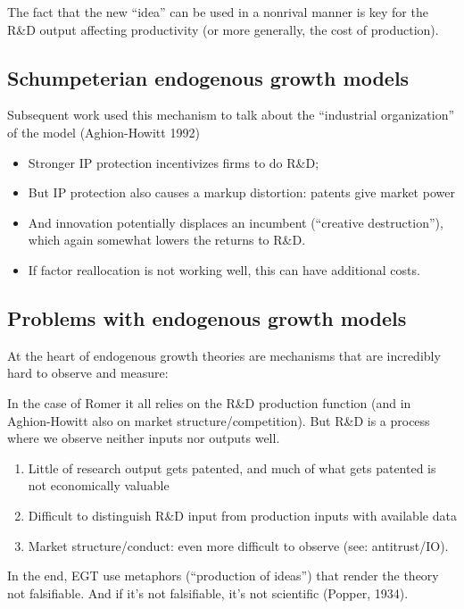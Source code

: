 The fact that the new “idea” can be used in a nonrival manner is key
for the R\&D output affecting productivity (or more generally, the cost
of production).

\subsection{Schumpeterian endogenous growth models}
Subsequent work used this mechanism to talk about the “industrial
organization” of the model (Aghion-Howitt 1992)

\begin{itemize}
    \item Stronger IP protection incentivizes firms to do R\&D;
    \item But IP protection also causes a markup distortion: patents give
    market power
    \item And innovation potentially displaces an incumbent (“creative
    destruction”), which again somewhat lowers the returns to R\&D.
    \item If factor reallocation is not working well, this can have additional
    costs.
\end{itemize}

\subsection{Problems with endogenous growth models}

At the heart of endogenous growth theories are mechanisms that are
incredibly hard to observe and measure:

In the case of Romer it all relies on the R\&D production function
(and in Aghion-Howitt also on market structure/competition). But
R\&D is a process where we observe neither inputs nor outputs well.
\begin{enumerate}
    \item Little of research output gets patented, and much of what gets patented is not economically valuable
    \item Difficult to distinguish R\&D input from production inputs with available data
    \item Market structure/conduct: even more difficult to observe (see:
    antitrust/IO).
\end{enumerate}

In the end, EGT use metaphors (“production of ideas”) that render the theory not falsifiable. 
And if it’s not falsifiable, it’s not scientific (Popper, 1934).